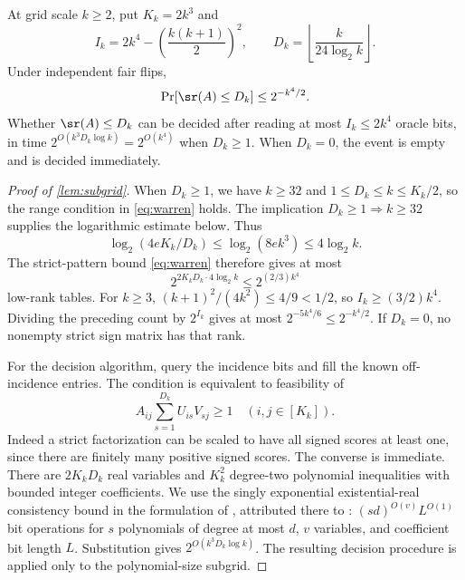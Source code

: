 \begin{lemma}\label{lem:subgrid}
At grid scale $k\ge2$, put $K_k=2k^3$ and
\[
 I_k=2k^4-\left(\frac{k(k+1)}2\right)^2,
 \qquad D_k=\left\lfloor\frac{k}{24\log_2 k}\right\rfloor.
\]
Under independent fair flips,
\[
 \Pr[\sr(A)\le D_k]\le2^{-k^4/2}.
\]
Whether $\sr(A)\le D_k$ can be decided after reading at most $I_k\le2k^4$ oracle bits, in time $2^{O(k^3D_k\log k)}=2^{O(k^4)}$ when $D_k\ge1$. When $D_k=0$, the event is empty and is decided immediately.
\end{lemma}

\begin{proof}[Proof of \cref{lem:subgrid}]
When $D_k\ge1$, we have $k\ge32$ and $1\le D_k\le k\le K_k/2$, so the range condition in \eqref{eq:warren} holds. The implication $D_k\ge1\Rightarrow k\ge32$ supplies the logarithmic estimate below. Thus
\[
 \log_2(4eK_k/D_k)\le\log_2(8e k^3)\le4\log_2k.
\]
The strict-pattern bound \eqref{eq:warren} therefore gives at most
\[
 2^{2K_kD_k\cdot4\log_2k}\le2^{(2/3)k^4}
\]
low-rank tables. For $k\ge3$, $(k+1)^2/(4k^2)\le4/9<1/2$, so $I_k\ge(3/2)k^4$. Dividing the preceding count by $2^{I_k}$ gives at most $2^{-5k^4/6}\le2^{-k^4/2}$. If $D_k=0$, no nonempty strict sign matrix has that rank.

For the decision algorithm, query the incidence bits and fill the known off-incidence entries. The condition is equivalent to feasibility of
\[
 A_{ij}\sum_{s=1}^{D_k}U_{is}V_{sj}\ge1\quad(i,j\in[K_k]).
\]
Indeed a strict factorization can be scaled to have all signed scores at least one, since there are finitely many positive signed scores. The converse is immediate. There are $2K_kD_k$ real variables and $K_k^2$ degree-two polynomial inequalities with bounded integer coefficients. We use the singly exponential existential-real consistency bound in the formulation of \citet{Vorobjov21}, attributed there to \citet{Renegar92}: $(sd)^{O(v)}L^{O(1)}$ bit operations for $s$ polynomials of degree at most $d$, $v$ variables, and coefficient bit length $L$. Substitution gives $2^{O(k^3D_k\log k)}$. The resulting decision procedure is applied only to the polynomial-size subgrid.
\end{proof}

